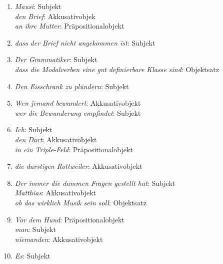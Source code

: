 \begin{enumerate}
  \item \textit{Mausi}: Subjekt\\
    \textit{den Brief}: Akkusativobjek\\
    \textit{an ihre Mutter}: Präpositionalobjekt
  \item \textit{dass der Brief nicht angekommen ist}: Subjekt
  \item \textit{Der Grammatiker}: Subjekt\\
    \textit{dass die Modalverben eine gut definierbare Klasse sind}: Objektsatz
  \item \textit{Den Eisschrank zu plündern}: Subjekt
  \item \textit{Wen jemand bewundert}: Akkusativobjekt\\
    \textit{wer die Bewunderung empfindet}: Subjekt
  \item \textit{Ich}: Subjekt\\
    \textit{den Dart}: Akkusativobjekt\\
    \textit{in ein Triple-Feld}: Präpositionalobjekt
  \item \textit{die durstigen Rottweiler}: Akkusativobjekt
  \item \textit{Der immer die dummen Fragen gestellt hat}: Subjekt\\
    \textit{Matthias}: Akkusativobjekt\\
    \textit{ob das wirklich Musik sein soll}: Objektsatz 
  \item \textit{Vor dem Hund}: Präpositionalobjekt\\
    \textit{man}: Subjekt\\
    \textit{niemanden}: Akkusativobjekt
  \item \textit{Es}: Subjekt
\end{enumerate}

\label{sol:relationenundpraedikate02}

